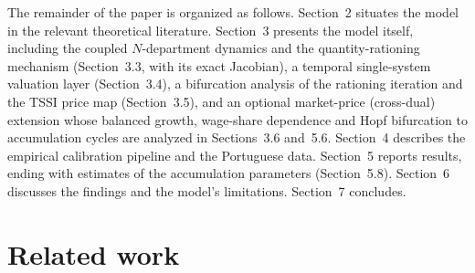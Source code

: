 \documentclass[11pt]{article}
\begin{document}
The remainder of the paper is organized as follows. Section~2 situates the
model in the relevant theoretical literature. Section~3 presents the model
itself, including the coupled $N$-department dynamics and the
quantity-rationing mechanism (Section~3.3, with its exact Jacobian), a
temporal single-system valuation layer (Section~3.4), a bifurcation
analysis of the rationing iteration and the TSSI price map
(Section~3.5), and an optional market-price (cross-dual) extension
whose balanced growth, wage-share dependence and Hopf bifurcation to
accumulation cycles are analyzed in Sections~3.6 and~5.6. Section~4 describes the empirical
calibration pipeline and the Portuguese data. Section~5 reports results,
ending with estimates of the accumulation parameters (Section~5.8).
Section~6 discusses the findings and the model's limitations. Section~7
concludes.

\section{Related work}
\end{document}
